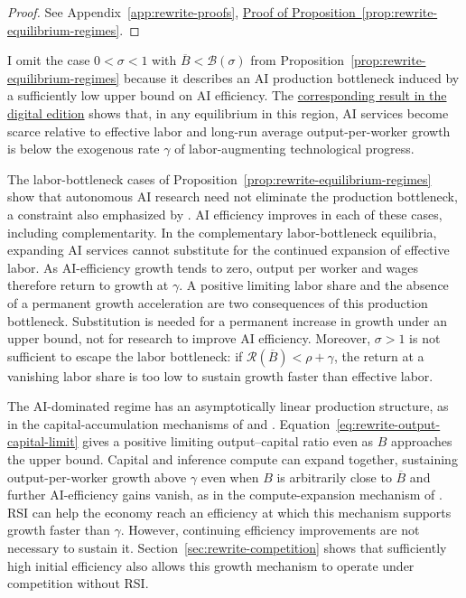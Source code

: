 \begin{proof}
See Appendix~\ref{app:rewrite-proofs},
\hyperref[proof:rewrite-equilibrium-regimes]{Proof of
Proposition~\ref*{prop:rewrite-equilibrium-regimes}}.
\end{proof}

I omit the case $0<\sigma<1$ with
$\overline B<\mathcal B(\sigma)$ from
Proposition~\ref{prop:rewrite-equilibrium-regimes} because it describes
an AI production bottleneck induced by a sufficiently low upper bound
on AI efficiency. The
\href{https://oliverpardo1979.github.io/ai-growth-and-labor/#prop:rewrite-low-cap-complements}
{corresponding result in the digital edition} shows that, in any equilibrium
in this region, AI services become scarce relative to effective labor
and long-run average output-per-worker growth is below the exogenous
rate $\gamma$ of labor-augmenting technological progress.


The labor-bottleneck cases of Proposition~\ref{prop:rewrite-equilibrium-regimes}
show that autonomous AI research need not eliminate the production
bottleneck, a constraint also emphasized by \citet{aghionjonesjones2019}.
AI efficiency improves in each of these cases, including complementarity.
In the complementary labor-bottleneck equilibria, expanding AI services
cannot substitute for the continued expansion of effective labor. As
AI-efficiency growth tends to zero, output per worker and wages therefore return
to growth at $\gamma$. A positive limiting labor share and the absence
of a permanent growth acceleration are two consequences of this
production bottleneck.
Substitution is needed for a permanent increase in growth under an upper
bound, not for research to improve AI efficiency.
Moreover, $\sigma>1$ is not sufficient to escape the labor bottleneck: if
$\mathcal R(\overline B)<\rho+\gamma$, the return at a vanishing labor
share is too low to sustain growth faster than effective labor.

The AI-dominated regime has an asymptotically linear production structure,
as in the capital-accumulation mechanisms of
\citet{rebelo1991} and \citet{jonesmanuelli1990}.
Equation~\eqref{eq:rewrite-output-capital-limit} gives a positive limiting
output--capital ratio even as $B$ approaches the upper bound.
Capital and inference compute can expand together, sustaining output-per-worker growth above
$\gamma$ even when $B$ is arbitrarily close to $\overline B$ and further
AI-efficiency gains vanish, as in the compute-expansion mechanism of
\citet{restrepo2025agi}.
RSI can help the economy reach an efficiency at which this mechanism
supports growth faster than $\gamma$. However, continuing efficiency improvements
are not necessary to sustain it. Section~\ref{sec:rewrite-competition}
shows that sufficiently high initial efficiency also allows this growth
mechanism to operate under competition without RSI.

